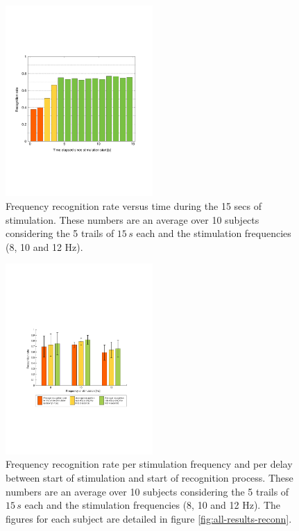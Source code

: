 \documentclass{svmult}
\begin{document}
\begin{figure}
\center
\includegraphics[width=0.5\textwidth]{figures/all_time_reconn.pdf}
\caption{Frequency recognition rate versus time during the 15 secs of stimulation. These numbers are an average over 10 subjects considering the 5 trails of $15\,s$ each and the stimulation frequencies (8, 10 and 12 Hz).} \label{fig:all_time_reconn}
\end{figure}

\begin{figure}
\center
\includegraphics[width=0.5\textwidth]{figures/taux-reconn.pdf}
\caption{Frequency recognition rate per stimulation frequency and per delay between start of stimulation and start of recognition process. These numbers are an average over 10 subjects considering the 5 trails of $15\,s$ each and the stimulation frequencies (8, 10 and 12 Hz). The figures for each subject are detailed in figure \ref{fig:all-results-reconn}.}
\label{fig:taux-reconn}
\end{figure}
\end{document}
